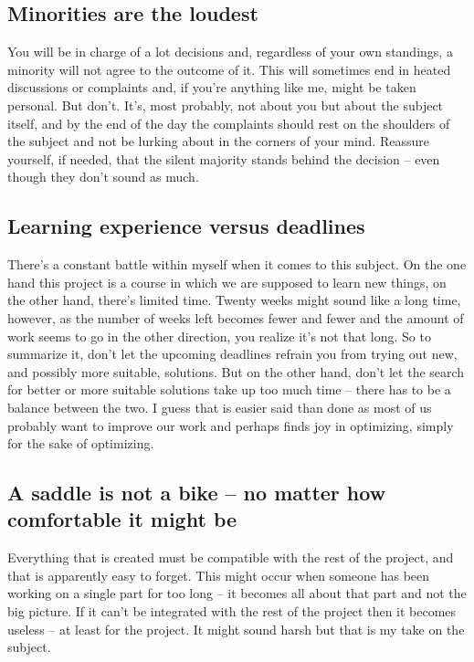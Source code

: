 \subsection{Minorities are the loudest}
You will be in charge of a lot decisions and, regardless of your own standings, a minority will not agree to the outcome of it. This will sometimes end in heated discussions or complaints and, if you're anything like me, might be taken personal. But don't. It's, most probably, not about you but about the subject itself, and by the end of the day the complaints should rest on the shoulders of the subject and not be lurking about in the corners of your mind. Reassure yourself, if needed, that the silent majority stands behind the decision -- even though they don't sound as much.
\subsection{Learning experience versus deadlines}
There's a constant battle within myself when it comes to this subject. On the one hand this project is a course in which we are supposed to learn new things, on the other hand, there's limited time. Twenty weeks might sound like a long time, however, as the number of weeks left becomes fewer and fewer and the amount of work seems to go in the other direction, you realize it's not that long. So to summarize it, don't let the upcoming deadlines refrain you from trying out new, and possibly more suitable, solutions. But on the other hand, don't let the search for better or more suitable solutions take up too much time -- there has to be a balance between the two. I guess that is easier said than done as most of us probably want to improve our work and perhaps finds joy in optimizing, simply for the sake of optimizing.
\subsection{A saddle is not a bike -- no matter how comfortable it might be}
Everything that is created must be compatible with the rest of the project, and that is apparently easy to forget. This might occur when someone has been working on a single part for too long -- it becomes all about that part and not the big picture. If it can't be integrated with the rest of the project then it becomes useless -- at least for the project. It might sound harsh but that is my take on the subject.